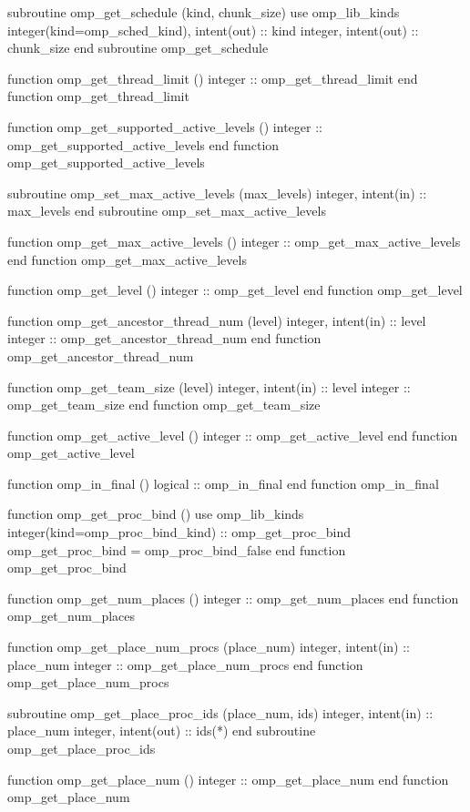 {\begin{ompfFunction}
    subroutine omp_get_schedule (kind, chunk_size)
      use omp_lib_kinds
      integer(kind=omp_sched_kind), intent(out) :: kind
      integer, intent(out) :: chunk_size
    end subroutine omp_get_schedule

    function omp_get_thread_limit ()
      integer :: omp_get_thread_limit
    end function omp_get_thread_limit

    function omp_get_supported_active_levels ()
      integer :: omp_get_supported_active_levels
    end function omp_get_supported_active_levels

    subroutine omp_set_max_active_levels (max_levels)
      integer, intent(in) :: max_levels
    end subroutine omp_set_max_active_levels

    function omp_get_max_active_levels ()
      integer :: omp_get_max_active_levels
    end function omp_get_max_active_levels

    function omp_get_level ()
      integer :: omp_get_level
    end function omp_get_level

    function omp_get_ancestor_thread_num (level)
      integer, intent(in) :: level
      integer :: omp_get_ancestor_thread_num
    end function omp_get_ancestor_thread_num

    function omp_get_team_size (level)
      integer, intent(in) :: level
      integer :: omp_get_team_size
    end function omp_get_team_size

    function omp_get_active_level ()
      integer :: omp_get_active_level
    end function omp_get_active_level

    function omp_in_final ()
      logical :: omp_in_final
    end function omp_in_final

    function omp_get_proc_bind ()
      use omp_lib_kinds
      integer(kind=omp_proc_bind_kind) :: omp_get_proc_bind
      omp_get_proc_bind = omp_proc_bind_false
    end function omp_get_proc_bind

    function omp_get_num_places ()
      integer :: omp_get_num_places
    end function omp_get_num_places

    function omp_get_place_num_procs (place_num)
      integer, intent(in) :: place_num
      integer :: omp_get_place_num_procs
    end function omp_get_place_num_procs

    subroutine omp_get_place_proc_ids (place_num, ids)
      integer, intent(in) :: place_num
      integer, intent(out) :: ids(*)
    end subroutine omp_get_place_proc_ids

    function omp_get_place_num ()
      integer :: omp_get_place_num
    end function omp_get_place_num


\end{ompfFunction}}
